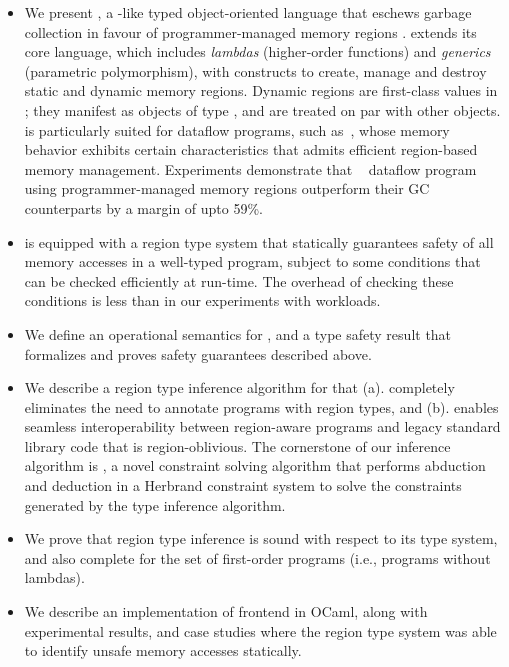 \begin{itemize}
  \item We present \name, a \csharp-like typed object-oriented language
  that eschews garbage collection in favour of programmer-managed
  memory regions . \name extends its core language, which includes
  \emph{lambdas} (higher-order functions) and \emph{generics}
  (parametric polymorphism), with constructs to create, manage and
  destroy static and dynamic memory regions. Dynamic regions are
  first-class values in \name; they manifest as objects of type
  , and are treated on par with other objects. \name is
  particularly suited for dataflow programs, such as~\naiad,
  whose memory behavior exhibits
  certain characteristics that admits efficient region-based memory management.
  Experiments demonstrate that   \naiad~\cite{naiad} dataflow program using programmer-managed
  memory regions outperform their GC counterparts by a margin of upto
  59\%. 

  \item \name is equipped with a region type system that statically
  guarantees safety of all memory accesses in a well-typed program,
  subject to some conditions that can be checked efficiently at
  run-time.
  The overhead of checking these conditions is less than
   in our experiments with \naiad workloads.

  \item We define an operational semantics for \name, and a type
  safety result that formalizes and proves safety guarantees described
  above.

  \item We describe a region type inference algorithm for \name that
  (a). completely eliminates the need to annotate \name programs with
  region types, and (b). enables seamless interoperability between
  region-aware \name programs and legacy standard library code that is
  region-oblivious. The cornerstone of our inference algorithm is
  \csolve, a novel constraint solving algorithm that performs
  abduction and deduction in a Herbrand constraint system to solve the
  constraints generated by the type inference algorithm.

  \item We prove that region type inference is sound with respect to
  its type system, and also complete for the set of first-order
  programs (i.e., programs without lambdas). 

  \item We describe an implementation of \name frontend in OCaml,
  along with experimental results, and case studies where the region
  type system was able to identify unsafe memory accesses statically.
  
\end{itemize}

